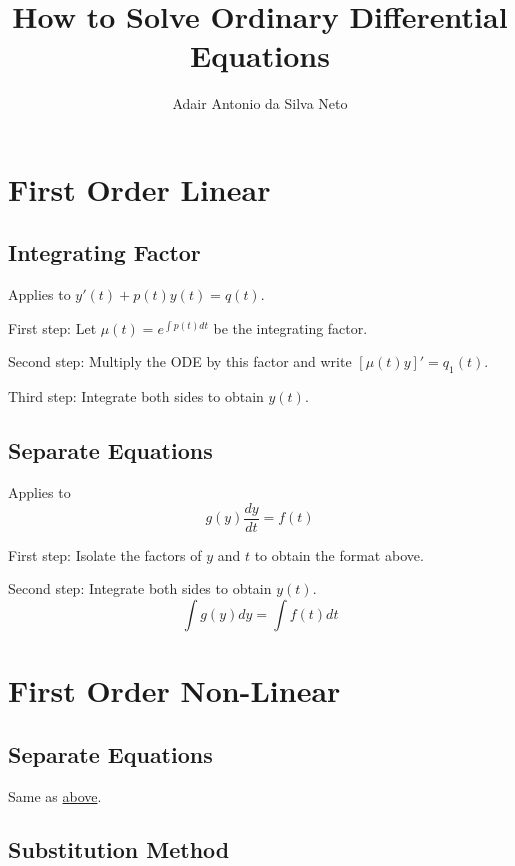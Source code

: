 \documentclass[12pt,a4paper]{article}
\author{Adair Antonio da Silva Neto}
\title{How to Solve Ordinary Differential Equations}
\begin{document}
\clearpage\maketitle
\thispagestyle{empty}

\newpage

\tableofcontents

\newpage
\clearpage
\setcounter{page}{1}

\section{First Order Linear}\label{first-order-linear}

\subsection{Integrating Factor}\label{integrating-factor}

Applies to \(y'(t) + p(t)y(t) = q(t)\).

First step: Let \(\mu(t) = e^{\int p(t)dt}\) be the integrating factor.

Second step: Multiply the ODE by this factor and write
\([\mu(t)y]' = q_1(t)\).

Third step: Integrate both sides to obtain \(y(t)\).

\subsection{Separate Equations}\label{separate-equations}

Applies to $$g(y) \frac{dy}{dt} = f(t)$$

First step: Isolate the factors of \(y\) and \(t\) to obtain the format above.

Second step: Integrate both sides to obtain \(y(t)\). 
$$\int g(y)dy = \int f(t) dt$$

\section{First Order Non-Linear}\label{first-order-non-linear}

\subsection{Separate Equations}

Same as \hyperref[separate-equations]{above}.

\subsection{Substitution Method}
\end{document}
